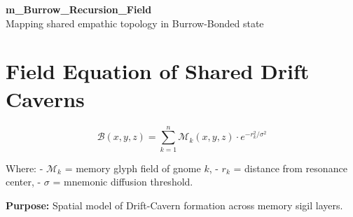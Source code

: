 \documentclass[12pt]{article}
\begin{document}
\begin{center}
    {\LARGE \textbf{m\_Burrow\_Recursion\_Field}}\\[1em]
    {\small Mapping shared empathic topology in Burrow-Bonded state}
\end{center}

\section*{Field Equation of Shared Drift Caverns}

\[
\mathcal{B}(x, y, z) = \sum_{k=1}^n \mathcal{M}_k(x, y, z) \cdot e^{-r_k^2 / \sigma^2}
\]

Where:
- $\mathcal{M}_k$ = memory glyph field of gnome $k$,
- $r_k$ = distance from resonance center,
- $\sigma$ = mnemonic diffusion threshold.

\textbf{Purpose:} Spatial model of Drift-Cavern formation across memory sigil layers.
\end{document}
